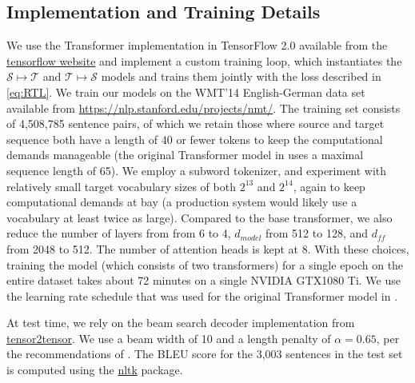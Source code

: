 \documentclass[11pt,a4paper]{article}
\begin{document}
\subsection{Implementation and Training Details}
We use the Transformer implementation in TensorFlow 2.0 available from the \href{https://www.tensorflow.org/tutorials/text/transformer}{tensorflow website} and implement a custom training loop, which instantiates the $\mathcal{S}\mapsto\mathcal{T}$ and $\mathcal{T}\mapsto\mathcal{S}$ models and trains them jointly with the loss described in \eqref{eq:RTL}. We train our models on the WMT'14 English-German data set available from \href{https://nlp.stanford.edu/projects/nmt/}{https://nlp.stanford.edu/projects/nmt/}. The training set consists of 4,508,785 sentence pairs, of which we retain those where source and target sequence both have a length of 40 or fewer tokens to keep the computational demands manageable (the original Transformer model in \citet{transformer} uses a maximal sequence length of 65). We employ a subword tokenizer, and experiment with relatively small target vocabulary sizes of both $2^{13}$ and $2^{14}$, again to keep computational demands at bay (a production system would likely use a vocabulary at least twice as large). Compared to the base transformer, we also reduce the number of layers from from 6 to 4, $d_{model}$ from 512 to 128, and $d_{ff}$ from 2048 to 512. The number of attention heads is kept at 8.
With these choices, training the model (which consists of two transformers) for a single epoch on the entire dataset takes about 72 minutes on a single NVIDIA GTX1080 Ti. We use the learning rate schedule that was used for the original Transformer model in \cite{transformer}.


At test time, we rely on the beam search decoder implementation from \href{https://github.com/tensorflow/tensor2tensor/blob/master/tensor2tensor/utils}{tensor2tensor}. We use a beam width of 10 and a length penalty of $\alpha=0.65$, per the recommendations of \citet{googlenmt}. The BLEU score for the 3,003 sentences in the test set is computed using the \href{https://www.nltk.org/}{nltk} package.
\end{document}
